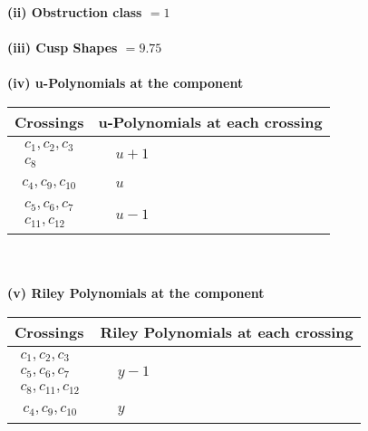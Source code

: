 \documentclass[1p]{elsarticle_modified}
\theoremstyle{definition}
\begin{document}
\flushleft \textbf{(ii) Obstruction class $= 1$}\\~\\
\flushleft \textbf{(iii) Cusp Shapes $= 9.75$}\\~\\
\newpage\renewcommand{\arraystretch}{1}
\flushleft \textbf{(iv) u-Polynomials at the component}\newline \\
\begin{tabular}{m{50pt}|m{274pt}}
Crossings & \hspace{64pt}u-Polynomials at each crossing \\
\hline $$\begin{aligned}c_{1},c_{2},c_{3}\\c_{8}\end{aligned}$$&$\begin{aligned}
&u+1
\end{aligned}$\\
\hline $$\begin{aligned}c_{4},c_{9},c_{10}\end{aligned}$$&$\begin{aligned}
&u
\end{aligned}$\\
\hline $$\begin{aligned}c_{5},c_{6},c_{7}\\c_{11},c_{12}\end{aligned}$$&$\begin{aligned}
&u-1
\end{aligned}$\\
\hline
\end{tabular}\\~\\
\newpage\renewcommand{\arraystretch}{1}
\flushleft \textbf{(v) Riley Polynomials at the component}\newline \\
\begin{tabular}{m{50pt}|m{274pt}}
Crossings & \hspace{64pt}Riley Polynomials at each crossing \\
\hline $$\begin{aligned}c_{1},c_{2},c_{3}\\c_{5},c_{6},c_{7}\\c_{8},c_{11},c_{12}\end{aligned}$$&$\begin{aligned}
&y-1
\end{aligned}$\\
\hline $$\begin{aligned}c_{4},c_{9},c_{10}\end{aligned}$$&$\begin{aligned}
&y
\end{aligned}$\\
\hline
\end{tabular}\\~\\
\end{document}
